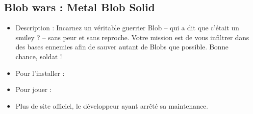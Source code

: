 \subsection{Blob wars : Metal Blob Solid}
\begin{itemize}
\begingroup
{}
\item Description : Incarnez un véritable guerrier Blob -- qui a dit que c'était un smiley ? -- sans peur et sans reproche. Votre mission est de vous infiltrer dans des bases ennemies afin de sauver autant de Blobs que possible. Bonne chance, soldat !{\par}
\endgroup
\item Pour l'installer : 
\item Pour jouer : 
\item Plus de site officiel, le développeur ayant arrêté sa maintenance.{\par}
\end{itemize}
